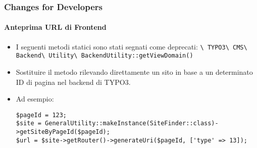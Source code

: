 \begin{frame}[fragile]
	\frametitle{Changes for Developers}
	\framesubtitle{Anteprima URL di Frontend}

	\lstset{basicstyle=\tiny\ttfamily}

	\begin{itemize}
		\item I seguenti metodi statici sono stati segnati come deprecati:\newline
			\smaller\texttt{\textbackslash
				TYPO3\textbackslash
				CMS\textbackslash
				Backend\textbackslash
				Utility\textbackslash
				BackendUtility::getViewDomain()}\normalsize

		\item Sostituire il metodo rilevando direttamente un sito in base a un determinato ID di pagina nel backend di TYPO3.
		\item Ad esempio:

\begin{lstlisting}
$pageId = 123;
$site = GeneralUtility::makeInstance(SiteFinder::class)->getSiteByPageId($pageId);
$url = $site->getRouter()->generateUri($pageId, ['type' => 13]);
\end{lstlisting}

	\end{itemize}

\end{frame}



